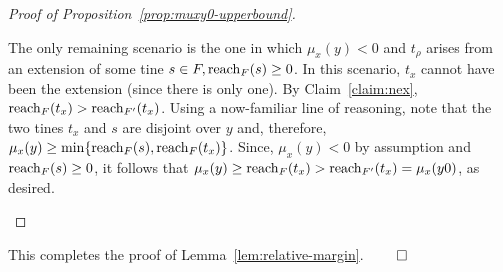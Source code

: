 \begin{proof}[Proof of Proposition~\ref{prop:muxy0-upperbound}]
\begin{description}[font=\normalfont\itshape\space]
      The only remaining scenario is the one in which 
      $\mu_x(y)<0$ and $t_\rho$ arises from an extension 
      of some tine $s \in F, \operatorname{reach}_F(s) \geq 0$. 
      In this scenario, $t_x$ cannot have been the extension 
      (since there is only one). 
      By Claim~\ref{claim:nex}, 
      $\operatorname{reach}_F(t_x) > \operatorname{reach}_{F'}(t_x)$. 
      Using a now-familiar line of reasoning, note that 
      the two tines
      $t_x$ and $s$ are disjoint over $y$ 
      and, therefore, 
      $\mu_x(y) \geq \min\{\operatorname{reach}_F(s), \operatorname{reach}_F(t_x)\}$. 
      Since, 
      $\mu_x(y) < 0$ by assumption and $\operatorname{reach}_F(s) \geq 0$, 
      it follows that 
      $\mu_x(y) \geq \operatorname{reach}_F(t_x) > \operatorname{reach}_{F'}(t_x)=\mu_x(y0)$, as desired. \qedhere
    \end{description}
\end{proof}


This completes the proof of Lemma~\ref{lem:relative-margin}. 
\hfill $\qed$







